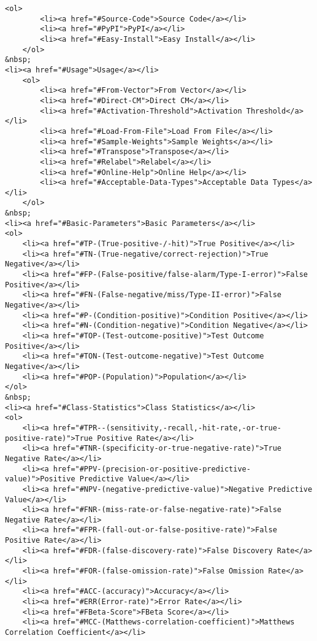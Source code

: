 \documentclass[11pt]{article}
\begin{document}
\begin{verbatim}
<ol>
        <li><a href="#Source-Code">Source Code</a></li>
        <li><a href="#PyPI">PyPI</a></li>
        <li><a href="#Easy-Install">Easy Install</a></li>
    </ol>
&nbsp;
<li><a href="#Usage">Usage</a></li>
    <ol>
        <li><a href="#From-Vector">From Vector</a></li>
        <li><a href="#Direct-CM">Direct CM</a></li>
        <li><a href="#Activation-Threshold">Activation Threshold</a></li>
        <li><a href="#Load-From-File">Load From File</a></li>
        <li><a href="#Sample-Weights">Sample Weights</a></li>
        <li><a href="#Transpose">Transpose</a></li>
        <li><a href="#Relabel">Relabel</a></li>
        <li><a href="#Online-Help">Online Help</a></li>
        <li><a href="#Acceptable-Data-Types">Acceptable Data Types</a></li>
    </ol>
&nbsp;
<li><a href="#Basic-Parameters">Basic Parameters</a></li>
<ol>
    <li><a href="#TP-(True-positive-/-hit)">True Positive</a></li>
    <li><a href="#TN-(True-negative/correct-rejection)">True Negative</a></li>
    <li><a href="#FP-(False-positive/false-alarm/Type-I-error)">False Positive</a></li>
    <li><a href="#FN-(False-negative/miss/Type-II-error)">False Negative</a></li>
    <li><a href="#P-(Condition-positive)">Condition Positive</a></li>
    <li><a href="#N-(Condition-negative)">Condition Negative</a></li>
    <li><a href="#TOP-(Test-outcome-positive)">Test Outcome Positive</a></li>
    <li><a href="#TON-(Test-outcome-negative)">Test Outcome Negative</a></li>
    <li><a href="#POP-(Population)">Population</a></li>
</ol>
&nbsp;
<li><a href="#Class-Statistics">Class Statistics</a></li>
<ol>
    <li><a href="#TPR--(sensitivity,-recall,-hit-rate,-or-true-positive-rate)">True Positive Rate</a></li>
    <li><a href="#TNR-(specificity-or-true-negative-rate)">True Negative Rate</a></li>
    <li><a href="#PPV-(precision-or-positive-predictive-value)">Positive Predictive Value</a></li>
    <li><a href="#NPV-(negative-predictive-value)">Negative Predictive Value</a></li>
    <li><a href="#FNR-(miss-rate-or-false-negative-rate)">False Negative Rate</a></li>
    <li><a href="#FPR-(fall-out-or-false-positive-rate)">False Positive Rate</a></li>
    <li><a href="#FDR-(false-discovery-rate)">False Discovery Rate</a></li>
    <li><a href="#FOR-(false-omission-rate)">False Omission Rate</a></li>
    <li><a href="#ACC-(accuracy)">Accuracy</a></li>
    <li><a href="#ERR(Error-rate)">Error Rate</a></li>
    <li><a href="#FBeta-Score">FBeta Score</a></li>
    <li><a href="#MCC-(Matthews-correlation-coefficient)">Matthews Correlation Coefficient</a></li>

\end{verbatim}
\end{document}
